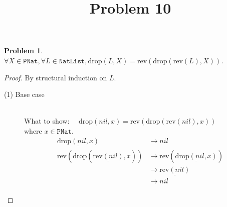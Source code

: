 \documentclass[12pt, a4paper]{article}
\title{Problem 10}
\date{\vspace{-5ex}}
\newtheorem{problem}{Problem}
\newcommand{\rmx}[1]{\mathrm{#1}}
\newcommand{\larrow}{\longrightarrow}
\newcommand{\under}{\underline}
\begin{document}
\maketitle

\begin{problem}
$\forall X \in \mathtt{PNat}, \forall L \in \mathtt{NatList}, \rmx{drop}(L, X) = \rmx{rev}(\rmx{drop}(\rmx{rev}(L), X))$.
\end{problem}
\begin{proof}
By structural induction on $L$.

\begin{description}
\item[(1) Base case]~\\
\noindent
What to show: $\quad \rmx{drop}(nil, x) = \rmx{rev}(\rmx{drop}(\rmx{rev}(nil), x))$ \\
where $x \in \mathtt{PNat}$.
\begin{align*}
\under{\rmx{drop}(nil, x)}
	&\larrow nil \tag{by drop1} \\
\rmx{rev}(\rmx{drop}(\under{\rmx{rev}(nil)}, x))
	&\larrow \rmx{rev}(\under{\rmx{drop}(nil, x)}) \tag{by rev1} \\
	&\larrow \under{\rmx{rev}(nil)} \tag{by drop1} \\
	&\larrow nil \tag{by rev1} \\
\end{align*}


\end{description}
\end{proof}
\end{document}
